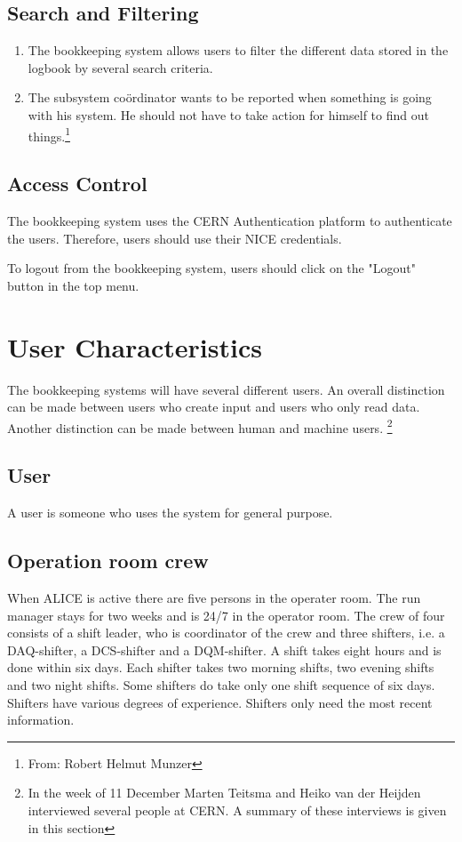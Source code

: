 \subsection{Search and Filtering}
\begin{enumerate}
  \item The bookkeeping system allows users to filter the different data stored in the logbook by several search criteria.
  \item The subsystem co\"ordinator wants to be reported when something is going with his system. He should not have to take action for himself to find out things.\footnote{From: Robert Helmut Munzer}
\end{enumerate}
\subsection{Access Control}
The bookkeeping system uses the CERN Authentication platform to authenticate the users. Therefore, users should use their NICE credentials.

To logout from the bookkeeping system, users should click on the "Logout" button in the top menu.



\section{User Characteristics}
The bookkeeping systems will have several different users. An overall distinction can be made between users who create input and users who only read data. Another distinction can be made between human and machine users. \footnote{In the week of 11 December Marten Teitsma and Heiko van der Heijden interviewed several people at CERN. A summary of these interviews is given in this section}

\subsection{User}
A user is someone who uses the system for general purpose.

\subsection{Operation room crew}
When ALICE is active there are five persons in the operater room. The run manager stays for two weeks and is 24/7 in the operator room. The crew of four consists of a shift leader, who is coordinator of the crew and three shifters, i.e. a DAQ-shifter, a DCS-shifter and a DQM-shifter. A shift takes eight hours and is done within six days. Each shifter takes two morning shifts, two evening shifts and two night shifts. Some shifters do take only one shift sequence of six days. Shifters have various degrees of experience. Shifters only need the most recent information. 

